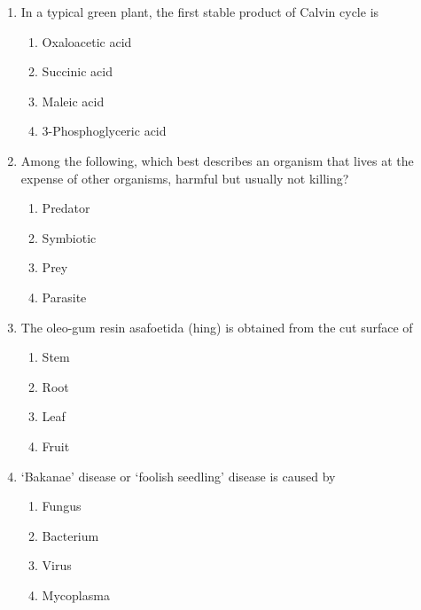 \documentclass[journal,12pt,onecolumn]{IEEEtran}
\begin{document}
\begin{enumerate}[label=\arabic*.]
\item In a typical green plant, the first stable product of Calvin cycle is
\begin{multicols}{2}
\begin{enumerate}[label=(\Alph*)]
    \item Oxaloacetic acid
    \item Succinic acid
    \item Maleic acid
    \item 3-Phosphoglyceric acid
\end{enumerate}
\end{multicols}

\item Among the following, which best describes an organism that lives at the expense of other organisms, harmful but usually not killing?
\begin{multicols}{2}
\begin{enumerate}[label=(\Alph*)]
    \item Predator
    \item Symbiotic
    \item Prey
    \item Parasite
\end{enumerate}
\end{multicols}

\item The oleo-gum resin asafoetida (hing) is obtained from the cut surface of
\begin{multicols}{2}
\begin{enumerate}[label=(\Alph*)]
    \item Stem
    \item Root
    \item Leaf
    \item Fruit
\end{enumerate}
\end{multicols}

\item ‘Bakanae’ disease or ‘foolish seedling’ disease is caused by
\begin{multicols}{2}
\begin{enumerate}[label=(\Alph*)]
    \item Fungus
    \item Bacterium
    \item Virus
    \item Mycoplasma
\end{enumerate}
\end{multicols}


\end{enumerate}
\end{document}
